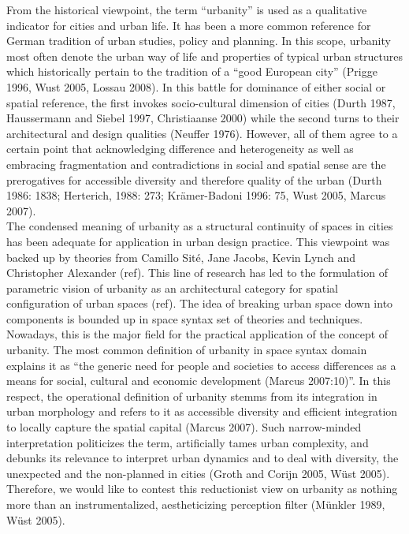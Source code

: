 \documentclass[11pt]{report}
\begin{document}
From the historical viewpoint, the term “urbanity”  is used as a qualitative indicator for cities and urban life. It has been a more common reference for German tradition of urban studies, policy and planning. In this scope, urbanity most often denote the urban way of life and properties of typical urban structures which historically pertain to the tradition of a “good European city” (Prigge 1996, Wust 2005, Lossau 2008). In this battle for dominance of either social or spatial reference, the first invokes socio-cultural dimension of cities (Durth 1987, Haussermann and Siebel 1997, Christiaanse 2000) while the second turns to their architectural and design qualities (Neuffer 1976). However, all of them agree to a certain point that acknowledging difference and heterogeneity as well as embracing fragmentation and contradictions in social and spatial sense are the prerogatives for accessible diversity and therefore quality of the urban (Durth 1986: 1838; Herterich, 1988: 273; Krämer-Badoni 1996: 75, Wust 2005, Marcus 2007). 
\\
The condensed meaning of urbanity as a structural continuity of spaces in cities has been adequate for application in urban design practice. This viewpoint was backed up by theories from Camillo Sité, Jane Jacobs, Kevin Lynch and Christopher Alexander (ref). This line of research has led to the formulation of parametric vision of urbanity as an architectural category for spatial configuration of urban spaces (ref). The idea of breaking urban space down into components is bounded up in space syntax set of theories and techniques. Nowadays, this is the major field for the practical application of the concept of urbanity. The most common definition of urbanity in space syntax domain explains it as “the generic need for people and societies to access differences as a means for social, cultural and economic development (Marcus 2007:10)”. In this respect, the operational definition of urbanity stemms from its integration in urban morphology  and refers to it as accessible diversity and efficient integration to locally capture the spatial capital (Marcus 2007). Such narrow-minded interpretation politicizes the term, artificially tames urban complexity, and debunks its relevance to interpret urban dynamics  and to deal with diversity, the unexpected and the non-planned in cities (Groth and Corijn 2005, Wüst 2005). Therefore, we would like to contest this reductionist view on urbanity as nothing more than an instrumentalized, aestheticizing perception filter (Münkler 1989, Wüst 2005).
\\
\end{document}
